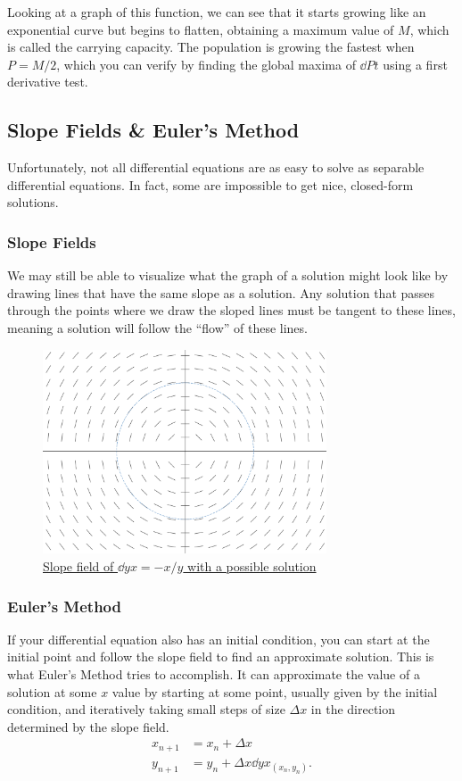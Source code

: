 Looking at a graph of this function, we can see that it starts growing like an exponential curve but begins to flatten, obtaining a maximum value of $M$, which is called the carrying capacity.
The population is growing the fastest when $P=M/2$, which you can verify by finding the global maxima of $\dd{P}{t}$ using a first derivative test.

\subsection{Slope Fields \& Euler's Method}
Unfortunately, not all differential equations are as easy to solve as separable differential equations.
In fact, some are impossible to get nice, closed-form solutions.
\subsubsection{Slope Fields}
We may still be able to visualize what the graph of a solution might look like by drawing lines that have the same slope as a solution.
Any solution that passes through the points where we draw the sloped lines must be tangent to these lines, meaning a solution will follow the ``flow'' of these lines.

\begin{figure}[H]
	\label{slope_field}
	\centering
	\includegraphics[width=0.75\textwidth]{./applications_integrals/slope_field.png}
	\caption{\hyperref{}{}{}{Slope field of $\dd{y}{x}=-x/y$ with a possible solution}}
\end{figure}

\subsubsection{Euler's Method}
If your differential equation also has an initial condition, you can start at the initial point and follow the slope field to find an approximate solution.
This is what Euler's Method tries to accomplish.
It can approximate the value of a solution at some $x$ value by starting at some point, usually given by the initial condition, and iteratively taking small steps of size $\Delta x$ in the direction determined by the slope field.
\begin{align*}
	x_{n+1} &= x_n + \Delta x \\
	y_{n+1} &= y_n + \Delta x\dd{y}{x}_{(x_n,y_n)}.
\end{align*}

